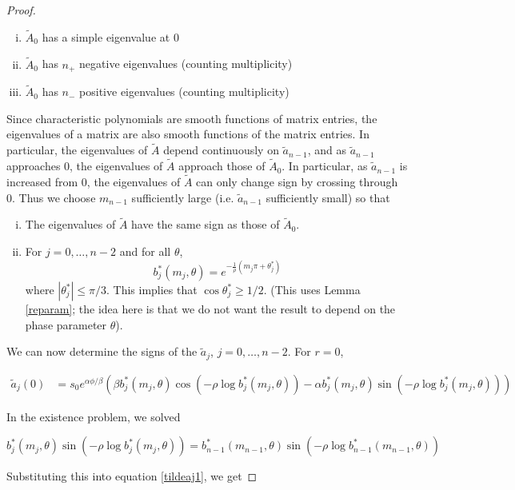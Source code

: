 \documentclass[thesis.tex]{subfiles}
\begin{document}
\begin{lemma}
\begin{proof}
\begin{enumerate}[(i)]
\item $\tilde{A}_0$ has a simple eigenvalue at 0
\item $\tilde{A}_0$ has $n_+$ negative eigenvalues (counting multiplicity)
\item $\tilde{A}_0$ has $n_-$ positive eigenvalues (counting multiplicity)
\end{enumerate}

Since characteristic polynomials are smooth functions of matrix entries, the eigenvalues of a matrix are also smooth functions of the matrix entries. In particular, the eigenvalues of $\tilde{A}$ depend continuously on $\tilde{a}_{n-1}$, and as $\tilde{a}_{n-1}$ approaches 0, the eigenvalues of $\tilde{A}$ approach those of $\tilde{A}_0$. In particular, as $\tilde{a}_{n-1}$ is increased from 0, the eigenvalues of $\tilde{A}$ can only change sign by crossing through 0. Thus we choose $m_{n-1}$ sufficiently large (i.e. $\tilde{a}_{n-1}$ sufficiently small) so that

\begin{enumerate}[(i)]
	\item The eigenvalues of $\tilde{A}$ have the same sign as those of $\tilde{A}_0$.
	\item For $j = 0, \dots, n-2$ and for all $\theta$,
	\[
	b^*_j(m_j, \theta) = e^{ -\frac{1}{\rho} ( m_j \pi + \theta^*_j ) }
	\]
	where $|\theta^*_j| \leq \pi/3$. This implies that $\cos \theta^*_j \geq 1/2$. (This uses Lemma \ref{reparam}; the idea here is that we do not want the result to depend on the phase parameter $\theta$).
\end{enumerate}

We can now determine the signs of the $\tilde{a}_j$, $j = 0, \dots, n-2$. For $r = 0$,

\begin{align}\label{tildeaj1}
\tilde{a}_j(0)
&= s_0 e^{\alpha \phi/\beta} \left( \beta b^*_j(m_j, \theta) \cos\left( -\rho \log b^*_j(m_j, \theta) \right) - \alpha b^*_j(m_j, \theta) \sin \left(  -\rho \log b^*_j(m_j, \theta) \right) \right) 
\end{align}

In the existence problem, we solved

\[
b^*_j(m_j, \theta) \sin \left( -\rho \log b^*_j(m_j, \theta) \right) = b^*_{n-1}(m_{n-1}, \theta) \sin \left( -\rho \log b^*_{n-1}(m_{n-1}, \theta) \right)
\]

Substituting this into equation \eqref{tildeaj1}, we get


\end{proof}
\end{lemma}
\end{document}
